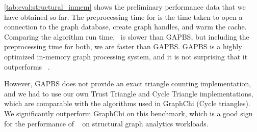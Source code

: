 \autoref{tab:eval:structural_inmem} shows the preliminary performance data that we have obtained so far.
The preprocessing time for \project{} is the time taken to open a connection to the graph database, create graph handles, and warm the cache.
Comparing the algorithm run time,~\project{} is slower than \ac{GAPBS}, but including the preprocessing time for both, we are faster than \ac{GAPBS}.
\ac{GAPBS} is a highly optimized in-memory graph processing system, and it is not surprising that it outperforms ~\project{}.

However, \ac{GAPBS} does not provide an exact triangle counting implementation, and we had to use our own Trust Triangle and Cycle Triangle implementations, which are comparable with the algorithms used in GraphChi (Cycle triangles).
We significantly outperform GraphChi on this benchmark, which is a good sign for the performance of ~\project{} on structural graph analytics workloads.
